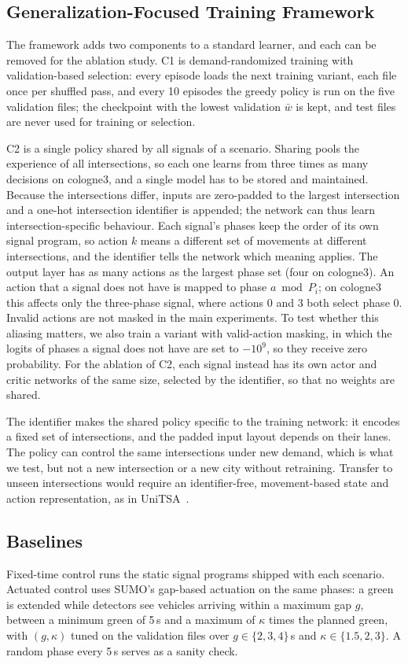 \subsection{Generalization-Focused Training Framework}
\label{sec:framework}
The framework adds two components to a standard learner, and each can be removed for the ablation study. C1 is demand-randomized training with validation-based selection: every episode loads the next training variant, each file once per shuffled pass, and every 10 episodes the greedy policy is run on the five validation files; the checkpoint with the lowest validation $\bar{w}$ is kept, and test files are never used for training or selection.

C2 is a single policy shared by all signals of a scenario. Sharing pools the experience of all intersections, so each one learns from three times as many decisions on cologne3, and a single model has to be stored and maintained. Because the intersections differ, inputs are zero-padded to the largest intersection and a one-hot intersection identifier is appended; the network can thus learn intersection-specific behaviour. Each signal's phases keep the order of its own signal program, so action $k$ means a different set of movements at different intersections, and the identifier tells the network which meaning applies. The output layer has as many actions as the largest phase set (four on cologne3). An action that a signal does not have is mapped to phase $a \bmod P_i$; on cologne3 this affects only the three-phase signal, where actions 0 and 3 both select phase 0. Invalid actions are not masked in the main experiments. To test whether this aliasing matters, we also train a variant with valid-action masking, in which the logits of phases a signal does not have are set to $-10^9$, so they receive zero probability. For the ablation of C2, each signal instead has its own actor and critic networks of the same size, selected by the identifier, so that no weights are shared.

The identifier makes the shared policy specific to the training network: it encodes a fixed set of intersections, and the padded input layout depends on their lanes. The policy can control the same intersections under new demand, which is what we test, but not a new intersection or a new city without retraining. Transfer to unseen intersections would require an identifier-free, movement-based state and action representation, as in UniTSA~\cite{wang2024unitsa}.

\subsection{Baselines}
Fixed-time control runs the static signal programs shipped with each scenario. Actuated control uses SUMO's gap-based actuation on the same phases: a green is extended while detectors see vehicles arriving within a maximum gap $g$, between a minimum green of 5\,s and a maximum of $\kappa$ times the planned green, with $(g,\kappa)$ tuned on the validation files over $g \in \{2,3,4\}$\,s and $\kappa \in \{1.5, 2, 3\}$. A random phase every 5\,s serves as a sanity check.
